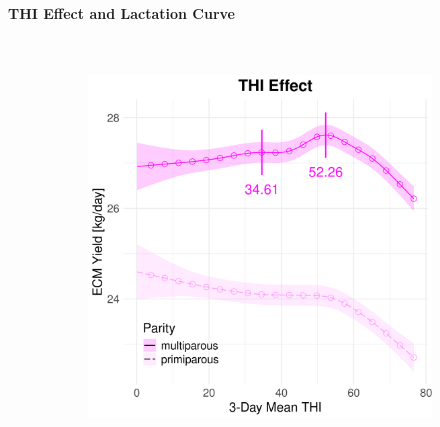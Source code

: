 \newpage
\paragraph{THI Effect and Lactation Curve} \quad \\
\begin{figure}[H]
    \centering
    \begin{subfigure}[b]{0.45\textwidth}
        \centering
        \includegraphics[width=\textwidth]{thesis/figures/models/ecm/full/sf_ecm_full/sf_ecm_full_marginal_thi_milk_combined.png}
    \end{subfigure}
    \hspace{0.05\textwidth} %
    \begin{subfigure}[b]{0.45\textwidth}
        \centering

\end{subfigure}
\end{figure}
